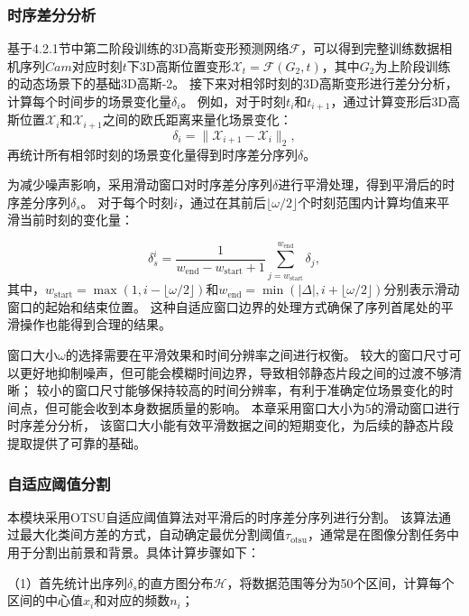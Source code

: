 \subsubsection{时序差分分析}
基于4.2.1节中第二阶段训练的3D高斯变形预测网络$\mathcal{F}$，可以得到完整训练数据相机序列$Cam$对应时刻$t$下3D高斯位置变形$\mathcal{X}_t=\mathcal{F}(G_2, t)$，其中$G_2$为上阶段训练的动态场景下的基础3D高斯-2。
接下来对相邻时刻的3D高斯变形进行差分分析，计算每个时间步的场景变化量$\delta_i$。
例如，对于时刻$t_i$和$t_{i+1}$，通过计算变形后3D高斯位置$\mathcal{X}_i$和$\mathcal{X}_{i+1}$之间的欧氏距离来量化场景变化：
\begin{equation}
\delta_i = \|\mathcal{X}_{i+1} - \mathcal{X}_i\|_2,
\end{equation}
再统计所有相邻时刻的场景变化量得到时序差分序列$\delta$。

为减少噪声影响，采用滑动窗口对时序差分序列$\delta$进行平滑处理，得到平滑后的时序差分序列$\delta_s$。
对于每个时刻$i$，通过在其前后$\lfloor\omega/2\rfloor$个时刻范围内计算均值来平滑当前时刻的变化量：

\begin{equation}
\delta_s^i = \frac{1}{w_{\text{end}} - w_{\text{start}} + 1} \sum_{j=w_{\text{start}}}^{w_{\text{end}}} \delta_j,
\end{equation}
其中，$w_{\text{start}} = \max(1, i - \lfloor\omega/2\rfloor)$和$w_{\text{end}} = \min(|\Delta|, i + \lfloor\omega/2\rfloor)$分别表示滑动窗口的起始和结束位置。
这种自适应窗口边界的处理方式确保了序列首尾处的平滑操作也能得到合理的结果。

窗口大小$\omega$的选择需要在平滑效果和时间分辨率之间进行权衡。
较大的窗口尺寸可以更好地抑制噪声，但可能会模糊时间边界，导致相邻静态片段之间的过渡不够清晰；
较小的窗口尺寸能够保持较高的时间分辨率，有利于准确定位场景变化的时间点，但可能会收到本身数据质量的影响。
本章采用窗口大小为5的滑动窗口进行时序差分分析，
该窗口大小能有效平滑数据之间的短期变化，为后续的静态片段提取提供了可靠的基础。

\subsubsection{自适应阈值分割}
本模块采用OTSU自适应阈值算法\cite{otsu}对平滑后的时序差分序列进行分割。
该算法通过最大化类间方差的方式，自动确定最优分割阈值$\tau_{\text{otsu}}$，通常是在图像分割任务中用于分割出前景和背景。具体计算步骤如下：

（1）首先统计出序列$\delta_s$的直方图分布$\mathcal{H}$，将数据范围等分为50个区间，计算每个区间的中心值$x_i$和对应的频数$n_i$；

